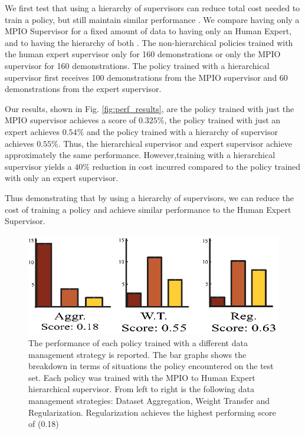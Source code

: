 \documentclass[10pt, conference]{ieeeconf}      %
\begin{document}
We first test  that using a hierarchy of supervisors can reduce total cost needed to train a policy, but still maintain similar performance .  We compare having only a MPIO Supervisor for a fixed amount of data to having only an Human Expert, and to having the hierarchy of both . The non-hierarchical policies trained with the human expert supervisor only for 160 demonstrations or only the MPIO supervisor for 160 demonstrations.  The policy trained with a hierarchical supervisor first receives  100 demonstrations from the MPIO supervisor and  60 demonstrations from the expert supervisor. 

Our results, shown in Fig. \ref{fig:perf_results}, are the policy trained with just the MPIO supervisor achieves a score of $0.325\%$, the policy trained with just an expert achieves $0.54\%$ and the policy trained with a hierarchy of supervisor achieves $0.55\%$.  Thus, the hierarchical supervisor and expert supervisor achieve approximately the same performance. However,training with a hierarchical supervisor yields a $40\%$ reduction in cost incurred compared to the policy trained with only an expert supervisor. 


Thus demonstrating that by using a hierarchy of supervisors, we can reduce the cost of training a policy and achieve similar performance to the Human Expert Supervisor.




\begin{figure}[t]
\centering 
\includegraphics{f_figs/cost_result.eps}

\caption{\footnotesize The performance of each policy trained with a different data management strategy is reported. The bar graphs shows the breakdown in terms of situations the policy encountered on the test set. Each policy was trained with the MPIO to Human Expert hierarchical supervisor. From left to right is the following data management strategies: Dataset Aggregation, Weight Transfer and Regularization. Regularization achieves the highest performing score of (0.18) }
\label{fig:cost_result}
\end{figure}
\end{document}
